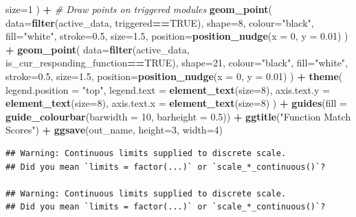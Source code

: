\documentclass[
]{book}
\newenvironment{Shaded}{\begin{snugshade}}{\end{snugshade}}
\newcommand{\CommentTok}[1]{\textcolor[rgb]{0.56,0.35,0.01}{\textit{#1}}}
\newcommand{\DataTypeTok}[1]{\textcolor[rgb]{0.13,0.29,0.53}{#1}}
\newcommand{\DecValTok}[1]{\textcolor[rgb]{0.00,0.00,0.81}{#1}}
\newcommand{\FloatTok}[1]{\textcolor[rgb]{0.00,0.00,0.81}{#1}}
\newcommand{\KeywordTok}[1]{\textcolor[rgb]{0.13,0.29,0.53}{\textbf{#1}}}
\newcommand{\NormalTok}[1]{#1}
\newcommand{\OperatorTok}[1]{\textcolor[rgb]{0.81,0.36,0.00}{\textbf{#1}}}
\newcommand{\OtherTok}[1]{\textcolor[rgb]{0.56,0.35,0.01}{#1}}
\newcommand{\StringTok}[1]{\textcolor[rgb]{0.31,0.60,0.02}{#1}}
\begin{document}
\begin{Shaded}
\begin{Highlighting}[]
    \DataTypeTok{size=}\DecValTok{1}
\NormalTok{  ) }\OperatorTok{+}
\StringTok{  }\CommentTok{\# Draw points on triggered modules}
\StringTok{  }\KeywordTok{geom\_point}\NormalTok{(}
    \DataTypeTok{data=}\KeywordTok{filter}\NormalTok{(active\_data, triggered}\OperatorTok{==}\OtherTok{TRUE}\NormalTok{),}
    \DataTypeTok{shape=}\DecValTok{8}\NormalTok{,}
    \DataTypeTok{colour=}\StringTok{"black"}\NormalTok{,}
    \DataTypeTok{fill=}\StringTok{"white"}\NormalTok{,}
    \DataTypeTok{stroke=}\FloatTok{0.5}\NormalTok{,}
    \DataTypeTok{size=}\FloatTok{1.5}\NormalTok{,}
    \DataTypeTok{position=}\KeywordTok{position\_nudge}\NormalTok{(}\DataTypeTok{x =} \DecValTok{0}\NormalTok{, }\DataTypeTok{y =} \FloatTok{0.01}\NormalTok{)}
\NormalTok{  ) }\OperatorTok{+}
\StringTok{  }\KeywordTok{geom\_point}\NormalTok{(}
    \DataTypeTok{data=}\KeywordTok{filter}\NormalTok{(active\_data, is\_cur\_responding\_function}\OperatorTok{==}\OtherTok{TRUE}\NormalTok{),}
    \DataTypeTok{shape=}\DecValTok{21}\NormalTok{,}
    \DataTypeTok{colour=}\StringTok{"black"}\NormalTok{,}
    \DataTypeTok{fill=}\StringTok{"white"}\NormalTok{,}
    \DataTypeTok{stroke=}\FloatTok{0.5}\NormalTok{,}
    \DataTypeTok{size=}\FloatTok{1.5}\NormalTok{,}
    \DataTypeTok{position=}\KeywordTok{position\_nudge}\NormalTok{(}\DataTypeTok{x =} \DecValTok{0}\NormalTok{, }\DataTypeTok{y =} \FloatTok{0.01}\NormalTok{)}
\NormalTok{  ) }\OperatorTok{+}
\StringTok{  }\KeywordTok{theme}\NormalTok{(}
    \DataTypeTok{legend.position =} \StringTok{"top"}\NormalTok{,}
    \DataTypeTok{legend.text =} \KeywordTok{element\_text}\NormalTok{(}\DataTypeTok{size=}\DecValTok{8}\NormalTok{),}
    \DataTypeTok{axis.text.y =} \KeywordTok{element\_text}\NormalTok{(}\DataTypeTok{size=}\DecValTok{8}\NormalTok{),}
    \DataTypeTok{axis.text.x =} \KeywordTok{element\_text}\NormalTok{(}\DataTypeTok{size=}\DecValTok{8}\NormalTok{)}
\NormalTok{  ) }\OperatorTok{+}
\StringTok{  }\KeywordTok{guides}\NormalTok{(}\DataTypeTok{fill =} \KeywordTok{guide\_colourbar}\NormalTok{(}\DataTypeTok{barwidth =} \DecValTok{10}\NormalTok{, }\DataTypeTok{barheight =} \FloatTok{0.5}\NormalTok{)) }\OperatorTok{+}
\StringTok{  }\KeywordTok{ggtitle}\NormalTok{(}\StringTok{"Function Match Scores"}\NormalTok{) }\OperatorTok{+}
\StringTok{  }\KeywordTok{ggsave}\NormalTok{(out\_name, }\DataTypeTok{height=}\DecValTok{3}\NormalTok{, }\DataTypeTok{width=}\DecValTok{4}\NormalTok{)}
\end{Highlighting}
\end{Shaded}

\begin{verbatim}
## Warning: Continuous limits supplied to discrete scale.
## Did you mean `limits = factor(...)` or `scale_*_continuous()`?

## Warning: Continuous limits supplied to discrete scale.
## Did you mean `limits = factor(...)` or `scale_*_continuous()`?
\end{verbatim}
\end{document}
